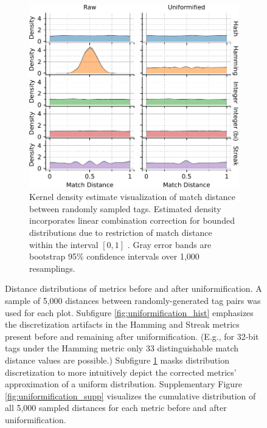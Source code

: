 \begin{figure}[!htbp]
\begin{center}
\begin{minipage}{\linewidth}
\begin{subfigure}[b]{\linewidth}
\begin{minipage}{0.75\textwidth}
\begin{center}
\includegraphics[width=\columnwidth]{img/uniformification/bitweight=0dot5+seed=1+title=low-score-distribution+viz=kde+_data_hathash_hash=75684cf1e73fb7f1+_script_fullcat_hash=73c1663bd9b49595+ext=}
\end{center}
\end{minipage}
\begin{minipage}{0.23\textwidth}
\caption{
Kernel density estimate visualization of match distance between randomly sampled tags.
Estimated density incorporates linear combination correction for bounded distributions due to restriction of match distance within the interval $[0,1]$ \citep{jones1993simple}.
Gray error bands are bootstrap 95\% confidence intervals over 1,000 resamplings.
}
\label{fig:uniformification_kde}
\end{minipage}
\end{subfigure}
\end{minipage}

\caption{
Distance distributions of metrics before and after uniformification.
A sample of 5,000 distances between randomly-generated tag pairs was used for each plot.
Subfigure \ref{fig:uniformification_hist} emphasizes the discretization artifacts in the Hamming and Streak metrics present before and remaining after uniformification.
(E.g., for 32-bit tags under the Hamming metric only 33 distinguishable match distance values are possible.)
Subfigure \ref{fig:uniformification_kde} masks distribution discretization to more intuitively depict the corrected metrics' approximation of a uniform distribution.
Supplementary Figure \ref{fig:uniformification_supp} visualizes the cumulative distribution of all 5,000 sampled distances for each metric before and after uniformification.
}
\label{fig:uniformification}

\end{center}
\end{figure}

